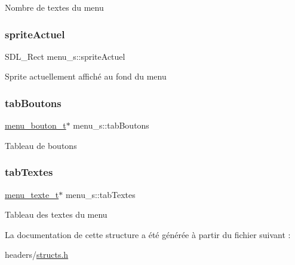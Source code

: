 Nombre de textes du menu \mbox{\label{structmenu__s_a441c56b239a287ebcd898db8625659b3}} 
\subsubsection{\texorpdfstring{sprite\+Actuel}{spriteActuel}}
{\footnotesize\ttfamily S\+D\+L\+\_\+\+Rect menu\+\_\+s\+::sprite\+Actuel}

Sprite actuellement affiché au fond du menu \mbox{\label{structmenu__s_a0f2f124fed40b189dfce498589c686ed}} 
\subsubsection{\texorpdfstring{tab\+Boutons}{tabBoutons}}
{\footnotesize\ttfamily \hyperlink{structmenu__bouton__s}{menu\+\_\+bouton\+\_\+t}$\ast$ menu\+\_\+s\+::tab\+Boutons}

Tableau de boutons \mbox{\label{structmenu__s_adcc943c449636cca0974499cb03d289b}} 
\subsubsection{\texorpdfstring{tab\+Textes}{tabTextes}}
{\footnotesize\ttfamily \hyperlink{structmenu__texte__s}{menu\+\_\+texte\+\_\+t}$\ast$ menu\+\_\+s\+::tab\+Textes}

Tableau des textes du menu 

La documentation de cette structure a été générée à partir du fichier suivant \+:\begin{DoxyCompactItemize}
\item 
headers/\hyperlink{structs_8h}{structs.\+h}\end{DoxyCompactItemize}
